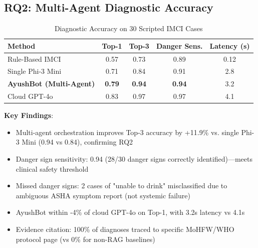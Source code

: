 \documentclass[conference,compsoc]{IEEEtran}
\begin{document}
\subsection{RQ2: Multi-Agent Diagnostic Accuracy}

\begin{table}[h]
\centering
\caption{Diagnostic Accuracy on 30 Scripted IMCI Cases}
\label{tab:diagnosis_accuracy}
\footnotesize
\begin{tabular}{@{}lcccc@{}}
\toprule
\textbf{Method} & \textbf{Top-1} & \textbf{Top-3} & \textbf{Danger Sens.} & \textbf{Latency (s)} \\ \midrule
Rule-Based IMCI & 0.57 & 0.73 & 0.89 & 0.12 \\
Single Phi-3 Mini & 0.71 & 0.84 & 0.91 & 2.8 \\
\textbf{AyushBot (Multi-Agent)} & \textbf{0.79} & \textbf{0.94} & \textbf{0.94} & 3.2 \\
Cloud GPT-4o & 0.83 & 0.97 & 0.97 & 4.1 \\
\bottomrule
\end{tabular}
\end{table}

\textbf{Key Findings}:
\begin{itemize}
    \item Multi-agent orchestration improves Top-3 accuracy by +11.9\% vs. single Phi-3 Mini (0.94 vs 0.84), confirming RQ2
    \item Danger sign sensitivity: 0.94 (28/30 danger signs correctly identified)—meets clinical safety threshold
    \item Missed danger signs: 2 cases of "unable to drink" misclassified due to ambiguous ASHA symptom report (not systemic failure)
    \item AyushBot within -4\% of cloud GPT-4o on Top-1, with 3.2s latency vs 4.1s
    \item Evidence citation: 100\% of diagnoses traced to specific MoHFW/WHO protocol page (vs 0\% for non-RAG baselines)
\end{itemize}
\end{document}
